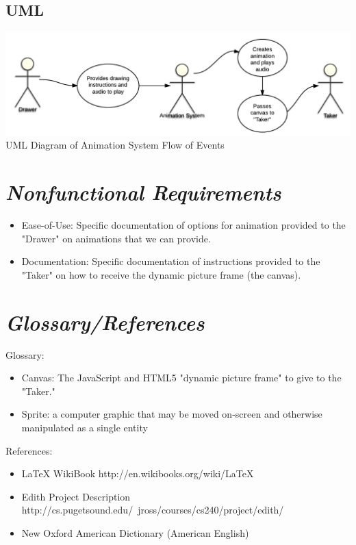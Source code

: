 \documentclass[12pt]{article}
\begin{document}
	

\subsection{UML}
\includegraphics[scale=.4]{UML.png}
UML Diagram of Animation System Flow of Events


\section{\emph{Nonfunctional Requirements}}

\begin{itemize}
	\item Ease-of-Use: Specific documentation of options for animation provided to the "Drawer" on animations that we can provide.
	\item Documentation: Specific documentation of instructions provided to the "Taker" on how to receive the dynamic picture frame (the canvas).
\end{itemize}

\section{\emph{Glossary/References}}
Glossary:
\begin{itemize}
	\item Canvas: The JavaScript and HTML5 "dynamic picture frame" to give to the "Taker."
	\item Sprite:  a computer graphic that may be moved on-screen and otherwise manipulated as a single entity
\end{itemize}

\noindent References: 
\begin{itemize}
	\item LaTeX WikiBook http://en.wikibooks.org/wiki/LaTeX
	\item Edith Project Description http://cs.pugetsound.edu/~jross/courses/cs240/project/edith/
	\item New Oxford American Dictionary (American English)
\end{itemize}
\end{document}
